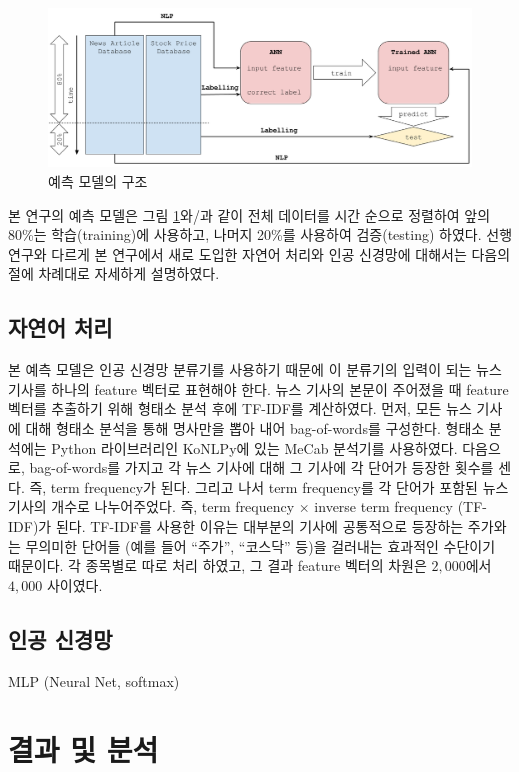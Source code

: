 \documentclass[a4paper,10pt]{article}
\begin{document}
\begin{figure}[h]
\includegraphics[width=\textwidth]{model}
\centering
\caption{예측 모델의 구조}
\label{fig:model}
\end{figure}
본 연구의 예측 모델은 그림 \ref{fig:model}와/과 같이 전체 데이터를 시간 순으로 정렬하여
앞의 80\%는 학습(training)에 사용하고, 나머지 20\%를 사용하여 검증(testing) 하였다.
선행 연구와 다르게 본 연구에서 새로 도입한 자연어 처리와 인공 신경망에 대해서는 다음의 절에 차례대로 자세하게 설명하였다.

\subsection{자연어 처리}

본 예측 모델은 인공 신경망 분류기를 사용하기 때문에 이 분류기의 입력이 되는 뉴스 기사를 하나의 feature 벡터로 표현해야 한다.
뉴스 기사의 본문이 주어졌을 때 feature 벡터를 추출하기 위해 형태소 분석 후에 TF-IDF를 계산하였다.
먼저, 모든 뉴스 기사에 대해 형태소 분석을 통해 명사만을 뽑아 내어 bag-of-words를 구성한다.
형태소 분석에는 Python 라이브러리인 KoNLPy에 있는 MeCab 분석기를 사용하였다.
다음으로, bag-of-words를 가지고 각 뉴스 기사에 대해 그 기사에 각 단어가 등장한 횟수를 센다.
즉, term frequency가 된다.
그리고 나서 term frequency를 각 단어가 포함된 뉴스 기사의 개수로 나누어주었다.
즉, term frequency $\times$ inverse term frequency (TF-IDF)가 된다.
TF-IDF를 사용한 이유는 대부분의 기사에 공통적으로 등장하는 주가와는 무의미한 단어들
(예를 들어 ``주가'', ``코스닥'' 등)을 걸러내는 효과적인 수단이기 때문이다.
각 종목별로 따로 처리 하였고, 그 결과 feature 벡터의 차원은 $2,000$에서 $4,000$ 사이였다.

\subsection{인공 신경망}

MLP (Neural Net, softmax)

\section{결과 및 분석}
\end{document}

